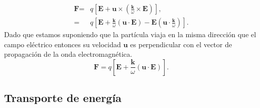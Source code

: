 \documentclass[11pt,fleqn]{book} %
\begin{document}
\begin{equation*}
\begin{split}
\textbf{F}=&q\left[ \textbf{E}+\textbf{u}\times\left( \frac{\textbf{k}}{\omega}\times\textbf{E} \right) \right],\\
=&q\left[ \textbf{E}+ \frac{\textbf{k}}{\omega}( \textbf{u} \cdot \textbf{E} )-\textbf{E} \left( \textbf{u} \cdot \frac{\textbf{k}}{\omega} \right) \right].
\end{split}
\end{equation*}
Dado que estamos suponiendo que la part\'icula viaja en la misma direcci\'on que el campo el\'ectrico entonces su velocidad $\textbf{u}$ es perpendicular con el vector de propagaci\'on de la onda electromagn\'etica.
\begin{equation}
\textbf{F}=  q\left[ \textbf{E}+ \frac{\textbf{k}}{\omega}( \textbf{u} \cdot \textbf{E} ) \right].
  \end{equation}
\subsection{Transporte de energ\'ia}
\end{document}
